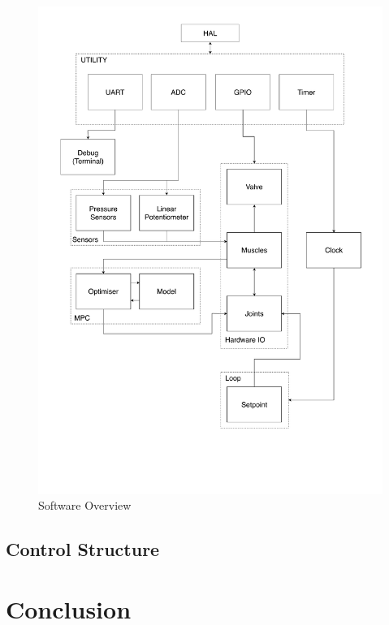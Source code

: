 \documentclass[11pt,a4paper]{article}
\begin{document}
\begin{figure}[hbt!]
    \centering
    \includegraphics[clip, trim=0cm 5cm 0cm 0cm, width=1.00\textwidth]{Software_Overview.pdf}
    \caption{Software Overview}
    \label{fig:software_arch}
\end{figure}

\subsection{Control Structure}
\label{sub:control_structure}


\newpage
\section{Conclusion}
\label{sec:conclusion}
\end{document}
